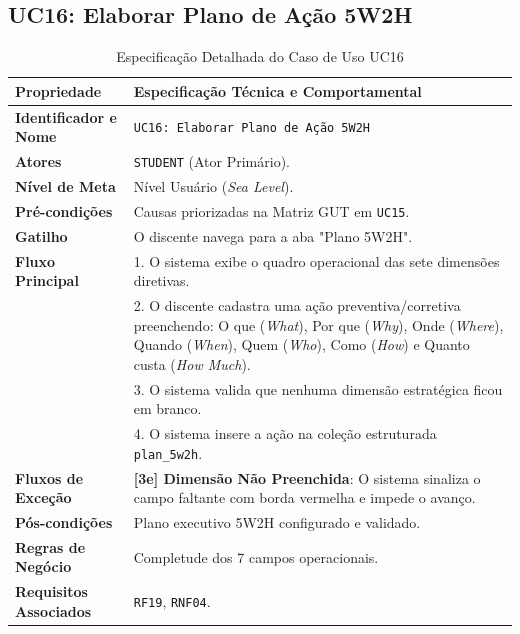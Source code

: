\subsection{UC16: Elaborar Plano de Ação 5W2H}
\label{uc16_especificacao}

\begin{table}[!ht]
\centering
\caption{Especificação Detalhada do Caso de Uso UC16}
\label{tab_uc16}
\footnotesize
\begin{tabularx}{\textwidth}{p{3.5cm} X}
\toprule
\textbf{Propriedade} & \textbf{Especificação Técnica e Comportamental} \\
\midrule
\textbf{Identificador e Nome} & \texttt{UC16: Elaborar Plano de Ação 5W2H} \\
\textbf{Atores} & \texttt{STUDENT} (Ator Primário). \\
\textbf{Nível de Meta} & Nível Usuário (\textit{Sea Level}). \\
\textbf{Pré-condições} & Causas priorizadas na Matriz GUT em \texttt{UC15}. \\
\textbf{Gatilho} & O discente navega para a aba "Plano 5W2H". \\
\textbf{Fluxo Principal} & 
1. O sistema exibe o quadro operacional das sete dimensões diretivas.\\
& 2. O discente cadastra uma ação preventiva/corretiva preenchendo: O que (\textit{What}), Por que (\textit{Why}), Onde (\textit{Where}), Quando (\textit{When}), Quem (\textit{Who}), Como (\textit{How}) e Quanto custa (\textit{How Much}).\\
& 3. O sistema valida que nenhuma dimensão estratégica ficou em branco.\\
& 4. O sistema insere a ação na coleção estruturada \texttt{plan\_5w2h}. \\
\textbf{Fluxos de Exceção} & 
\textbf{[3e] Dimensão Não Preenchida}: O sistema sinaliza o campo faltante com borda vermelha e impede o avanço. \\
\textbf{Pós-condições} & Plano executivo 5W2H configurado e validado. \\
\textbf{Regras de Negócio} & Completude dos 7 campos operacionais. \\
\textbf{Requisitos Associados} & \texttt{RF19}, \texttt{RNF04}. \\
\bottomrule
\end{tabularx}
\end{table}

